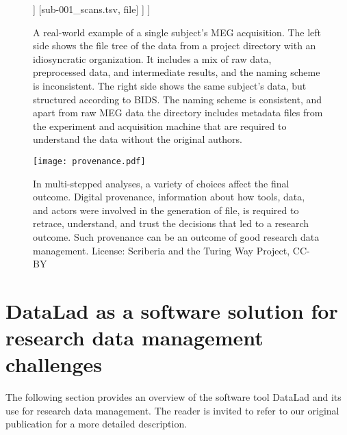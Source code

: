 \begin{figure}
{\begin{minipage}{.49\textwidth}
\begin{forest}
				]
				[sub-001\_scans.tsv, file]
				]
				]
			\end{forest}
		\end{minipage}
	}
	\caption[An example of a BIDS-structured dataset]{A real-world example of a single subject's MEG acquisition. The left side shows the file tree of the data from a project directory with an idiosyncratic organization. It includes a mix of raw data, preprocessed data, and intermediate results, and the naming scheme is inconsistent. The right side shows the same subject's data, but structured according to \gls{BIDS}. The naming scheme is consistent, and apart from raw MEG data the directory includes metadata files from the experiment and acquisition machine that are required to understand the data without the original authors.}
	\label{fig:BIDS}
\end{figure}


\begin{figure}
	\centering
	\texttt{[image: provenance.pdf]}
	\caption[Provenance throughout the research process]{In multi-stepped analyses, a variety of choices affect the final outcome. Digital provenance, information about how tools, data, and actors were involved in the generation of file, is required to retrace, understand, and trust the decisions that led to a research outcome. Such provenance can be an outcome of good research data management. License: Scriberia and the Turing Way Project, CC-BY}
	\label{fig:prov1}
\end{figure}




\section{DataLad as a software solution for research data management challenges}

	The following section provides an overview of the software tool DataLad and its use for research data management.
	The reader is invited to refer to our original publication \citep{Halchenko2021} for a more detailed description.%

